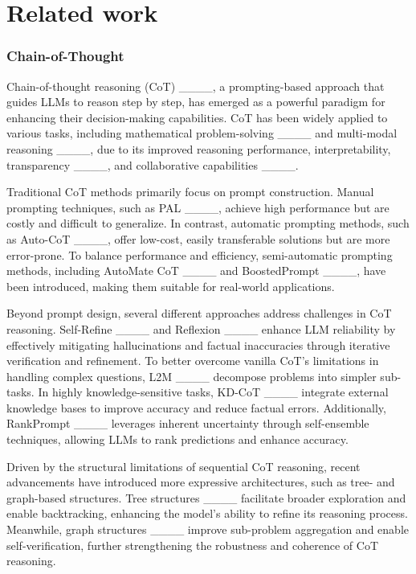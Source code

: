 \section{Related work}
\subsubsection{Chain-of-Thought}

Chain-of-thought reasoning (CoT) ____, a prompting-based approach that guides LLMs to reason step by step, has emerged as a powerful paradigm for enhancing their decision-making capabilities. CoT has been widely applied to various tasks, including mathematical problem-solving ____ and multi-modal reasoning ____, due to its improved reasoning performance, interpretability, transparency ____, and collaborative capabilities ____.

Traditional CoT methods primarily focus on prompt construction. Manual prompting techniques, such as PAL ____, achieve high performance but are costly and difficult to generalize. In contrast, automatic prompting methods, such as Auto-CoT ____, offer low-cost, easily transferable solutions but are more error-prone. To balance performance and efficiency, semi-automatic prompting methods, including AutoMate CoT ____ and BoostedPrompt ____, have been introduced, making them suitable for real-world applications.


Beyond prompt design, several different approaches address challenges in CoT reasoning. Self-Refine ____ and Reflexion ____ enhance LLM reliability by effectively mitigating hallucinations and factual inaccuracies through iterative verification and refinement. To better overcome vanilla CoT’s limitations in handling complex questions, L2M ____ decompose problems into simpler sub-tasks. In highly knowledge-sensitive tasks, KD-CoT ____ integrate external knowledge bases to improve accuracy and reduce factual errors. Additionally, RankPrompt ____ leverages inherent uncertainty through self-ensemble techniques, allowing LLMs to rank predictions and enhance accuracy.




Driven by the structural limitations of sequential CoT reasoning, recent advancements have introduced more expressive architectures, such as tree- and graph-based structures. Tree structures ____ facilitate broader exploration and enable backtracking, enhancing the model’s ability to refine its reasoning process. Meanwhile, graph structures ____ improve sub-problem aggregation and enable self-verification, further strengthening the robustness and coherence of CoT reasoning.

